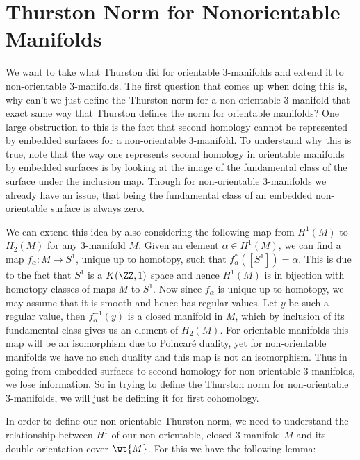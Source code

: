 \section{Thurston Norm for Nonorientable Manifolds}

We want to take what Thurston did for orientable 3-manifolds and extend it to non-orientable 3-manifolds. The first question that comes up when doing this is, why can't we just define the Thurston norm for a non-orientable 3-manifold that exact same way that Thurston defines the norm for orientable manifolds? One large obstruction to this is the fact that second homology cannot be represented by embedded surfaces for a non-orientable 3-manifold. To understand why this is true, note that the way one represents second homology in orientable manifolds by embedded surfaces is by looking at the image of the fundamental class of the surface under the inclusion map. Though for non-orientable 3-manifolds we already have an issue, that being the fundamental class of an embedded non-orientable surface is always zero. 

We can extend this idea by also considering the following map from $H^1(M)$ to $H_2(M)$ for any 3-manifold $M$. Given an element $\alpha \in H^1(M)$, we can find a map $f_\alpha: M \xrightarrow[]{} S^1$, unique up to homotopy, such that $f_\alpha^*([S^1]) = \alpha$. This is due to the fact that $S^1$ is a $K(\ZZ,1)$ space and hence $H^1(M)$ is in bijection with homotopy classes of maps $M$ to $S^1$. Now since $f_\alpha$ is unique up to homotopy, we may assume that it is smooth and hence has regular values. Let $y$ be such a regular value, then $f_\alpha^{-1}(y)$ is a closed manifold in $M$, which by inclusion of its fundamental class gives us an element of $H_2(M)$. For orientable manifolds this map will be an isomorphism due to Poincar\'e duality, yet for non-orientable manifolds we have no such duality and this map is not an isomorphism. Thus in going from embedded surfaces to second homology for non-orientable 3-manifolds, we lose information. So in trying to define the Thurston norm for non-orientable 3-manifolds, we will just be defining it for first cohomology. 

In order to define our non-orientable Thurston norm, we need to understand the relationship between $H^1$ of our non-orientable, closed 3-manifold $M$ and its double orientation cover $\wt{M}$. For this we have the following lemma:

